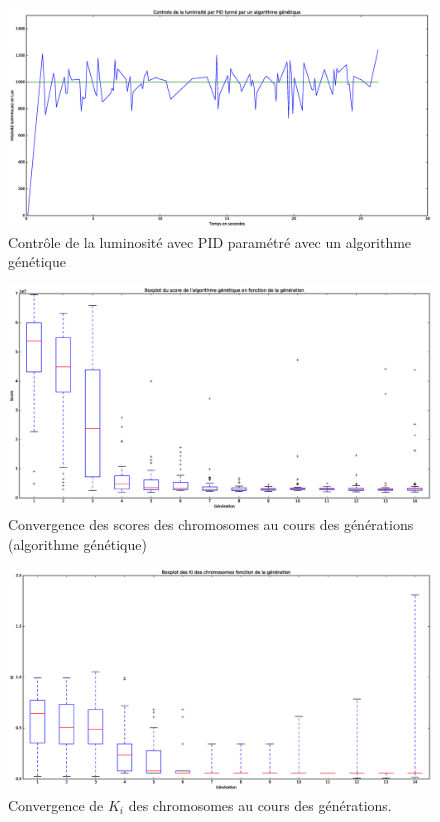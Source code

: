 \documentclass[a4paper,10pt]{report}
\begin{document}
\begin{figure}[htb!]
   \centering
   \includegraphics[scale=0.35]{Genetic.eps}
   \caption{\label{fig:genetique} Contrôle de la luminosité avec PID paramétré avec un algorithme génétique}
\end{figure}

\begin{figure}[htb!]
   \centering
   \includegraphics[scale=0.35]{GeneticBoxplot.eps}
    \caption{\label{fig:convergence} Convergence des scores des chromosomes au cours des générations (algorithme génétique)}
\end{figure}

\begin{figure}[htb!]
   \centering
   \includegraphics[scale=0.35]{KiBoxplot.eps}
    \caption{\label{fig:kibox} Convergence de $K_i$ des chromosomes au cours des générations.}
\end{figure}
\end{document}

